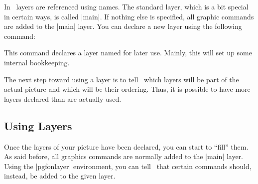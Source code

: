 In \pgfname\ layers are referenced using names. The standard layer, which is a
bit special in certain ways, is called |main|. If nothing else is specified,
all graphic commands are added to the |main| layer. You can declare a new layer
using the following command:

\begin{command}{\pgfdeclarelayer{}}
    This command declares a layer named  for later use. Mainly, this
    will set up some internal bookkeeping.
\end{command}

The next step toward using a layer is to tell \pgfname\ which layers will be
part of the actual picture and which will be their ordering. Thus, it is
possible to have more layers declared than are actually used.



\subsection{Using Layers}

Once the layers of your picture have been declared, you can start to ``fill''
them. As said before, all graphics commands are normally added to the |main|
layer. Using the |{pgfonlayer}| environment, you can tell \pgfname\ that
certain commands should, instead, be added to the given layer.

